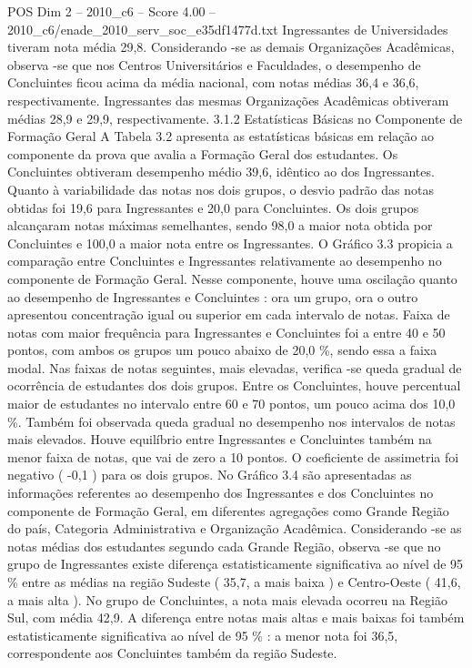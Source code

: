 \begin{textsample}{POS Dim 2 – 2010\_c6 – Score 4.00 – 2010\_c6/enade\_2010\_serv\_soc\_e35df1477d.txt}
Ingressantes de Universidades tiveram nota média 29,8.
Considerando -se as demais Organizações Acadêmicas, observa -se que nos Centros Universitários e Faculdades, o desempenho de Concluintes ficou acima da média nacional, com notas médias 36,4 e 36,6, respectivamente.
Ingressantes das mesmas Organizações Acadêmicas obtiveram médias 28,9 e 29,9, respectivamente. 3.1.2 Estatísticas Básicas no Componente de Formação Geral A Tabela 3.2 apresenta as estatísticas básicas em relação ao componente da prova que avalia a Formação Geral dos estudantes.
Os Concluintes obtiveram desempenho médio 39,6, idêntico ao dos Ingressantes.
Quanto à variabilidade das notas nos dois grupos, o desvio padrão das notas obtidas foi 19,6 para Ingressantes e 20,0 para Concluintes.
Os dois grupos alcançaram notas máximas semelhantes, sendo 98,0 a maior nota obtida por Concluintes e 100,0 a maior nota entre os Ingressantes.
O Gráfico 3.3 propicia a comparação entre Concluintes e Ingressantes relativamente ao desempenho no componente de Formação Geral.
Nesse componente, houve uma oscilação quanto ao desempenho de Ingressantes e Concluintes : ora um grupo, ora o outro apresentou concentração igual ou superior em cada intervalo de notas.
Faixa de notas com maior frequência para Ingressantes e Concluintes foi a entre 40 e 50 pontos, com ambos os grupos um pouco abaixo de 20,0 \%, sendo essa a faixa modal.
Nas faixas de notas seguintes, mais elevadas, verifica -se queda gradual de ocorrência de estudantes dos dois grupos.
Entre os Concluintes, houve percentual maior de estudantes no intervalo entre 60 e 70 pontos, um pouco acima dos 10,0 \%.
Também foi observada queda gradual no desempenho nos intervalos de notas mais elevados.
Houve equilíbrio entre Ingressantes e Concluintes também na menor faixa de notas, que vai de zero a 10 pontos.
O coeficiente de assimetria foi negativo ( -0,1 ) para os dois grupos.
No Gráfico 3.4 são apresentadas as informações referentes ao desempenho dos Ingressantes e dos Concluintes no componente de Formação Geral, em diferentes agregações como Grande Região do país, Categoria Administrativa e Organização Acadêmica.
Considerando -se as notas médias dos estudantes segundo cada Grande Região, observa -se que no grupo de Ingressantes existe diferença estatisticamente significativa ao nível de 95 \% entre as médias na região Sudeste ( 35,7, a mais baixa ) e Centro-Oeste ( 41,6, a mais alta ).
No grupo de Concluintes, a nota mais elevada ocorreu na Região Sul, com média 42,9.
A diferença entre notas mais altas e mais baixas foi também estatisticamente significativa ao nível de 95 \% : a menor nota foi 36,5, correspondente aos Concluintes também da região Sudeste.

\end{textsample}
